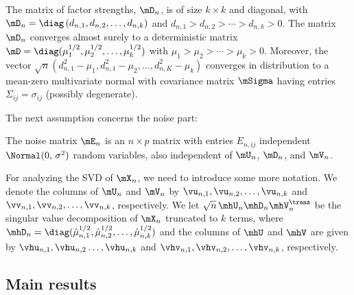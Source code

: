 \begin{assumption}\label{A:sizes}
    The matrix of factor strengths, $\mD_n$, is of size $k\times k$ and 
    diagonal, with 
    \(
        \mD_n = \diag \left( d_{n,1}, d_{n,2}, \ldots, d_{n,k} \right)
    \)
    and
    $d_{n,1} > d_{n,2} > \cdots > d_{n,k} > 0$.  The matrix $\mD_n$ converges
    almost surely to a deterministic matrix 
    $\mD = \diag( \mu_1^{1/2}, \mu_2^{1/2}, \ldots, \mu_k^{1/2})$ with
    $\mu_1 > \mu_2 > \cdots > \mu_k > 0$. Moreover, the vector
    \(
        \sqrt{n} ( d_{n,1}^2 - \mu_1, d_{n,1}^2 - \mu_2, 
                   \ldots, 
                   d_{n,K}^2 - \mu_k )
    \)
    converges in distribution to a mean-zero multivariate normal with 
    covariance matrix $\mSigma$ having entries $\Sigma_{ij} = \sigma_{ij}$
    (possibly degenerate).
\end{assumption}
\noindent
The next assumption concerns the noise part:

\begin{assumption}\label{A:noise}
    The noise matrix $\mE_n$ is an $n\times p$ matrix with entries 
    $E_{n,ij}$ independent $\Normal(0,\, \sigma^2)$ random variables, also
    independent of $\mU_n$, $\mD_n$, and $\mV_n$.
\end{assumption}
\noindent

For analyzing the SVD of $\mX_n$, we need to introduce some more notation. We denote the columns of $\mU_n$ and
$\mV_n$ by $\vu_{n,1}, \vu_{n,2}, \ldots, \vu_{n,k}$ and $\vv_{n,1},
\vv_{n,2}, \ldots, \vv_{n,k}$, respectively. We let 
\(
    \sqrt{n} \, \mhU_n \mhD_n \mhV_n^\trans
\)
be the singular value decomposition of
$\mX_n$ truncated to $k$ terms, where $\mhD_n = \diag( \hat \mu_{n,1}^{1/2},
\hat \mu_{n,2}^{1/2}, \ldots, \hat \mu_{n,k}^{1/2})$ and the columns of $\mhU$ and $\mhV$ are given
by $\vhu_{n,1}, \vhu_{n,2} \ldots, \vhu_{n,k}$ and $\vhv_{n,1}, \vhv_{n,2},
\ldots, \vhv_{n,k}$, respectively.


\subsection{Main results}

